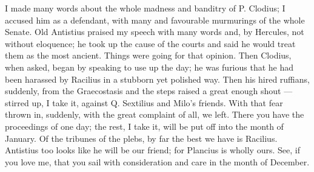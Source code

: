  I made many words about the whole madness and banditry of P. Clodius; I accused him as a defendant, with many and favourable murmurings of the whole Senate. Old Antistius praised my speech with many words and, by Hercules, not without eloquence; he took up the cause of the courts and said he would treat them as the most ancient. Things were going for that opinion. Then Clodius, when asked, began by speaking to use up the day; he was furious that he had been harassed by Racilius in a stubborn yet polished way. Then his hired ruffians, suddenly, from the Graecostasis and the steps raised a great enough shout --- stirred up, I take it, against Q. Sextilius and Milo's friends. With that fear thrown in, suddenly, with the great complaint of all, we left. There you have the proceedings of one day; the rest, I take it, will be put off into the month of January. Of the tribunes of the plebs, by far the best we have is Racilius. Antistius too looks like he will be our friend; for Plancius is wholly ours. See, if you love me, that you sail with consideration and care in the month of December.
